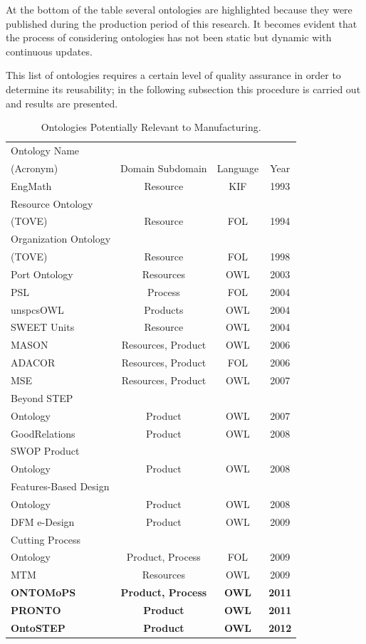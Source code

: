 At the bottom of the table several ontologies are highlighted because they were published during the production period of this research. It becomes evident that the process of considering ontologies has not been static but dynamic with continuous updates. 

This list of ontologies requires a certain level of quality assurance in order to determine its reusability; in the following subsection this procedure is carried out and results are presented.


\begin{table}[tp]%
	
	\caption{Ontologies Potentially Relevant to Manufacturing.}
	\scriptsize
	\label{table4.1}\centering %
	\begin{tabular}{lccc}
		\toprule %
		Ontology Name \\ (Acronym)	& Domain  Subdomain	& Language	& Year \\\toprule
		
		EngMath	& Resource	& KIF	& 1993 \\
		
		Resource Ontology \\ (TOVE)&	Resource &	FOL	& 1994 \\
		Organization Ontology \\ (TOVE)	& Resource&	FOL &	1998 \\
		Port Ontology &	Resources&	OWL&	2003 \\
		PSL&	Process &	FOL&	2004 \\
		unspcsOWL&	Products&	OWL&	2004 \\
		SWEET Units&	Resource&	OWL	&2004 \\
		MASON&	Resources, Product&	OWL	&2006 \\
		ADACOR&	Resources, Product&	FOL	&2006 \\
		MSE	&Resources, Product	&OWL	&2007 \\
		Beyond STEP \\ Ontology &	Product&	OWL	&2007 \\
		GoodRelations &	Product	&OWL&	2008 \\
		SWOP Product  \\ Ontology&	Product&	OWL&	2008 \\
		Features-Based Design \\ Ontology&	Product	&OWL&	2008 \\
		DFM e-Design &	Product	&OWL&	2009 \\
		Cutting Process \\ Ontology&	Product, Process&	FOL &	2009 \\
		MTM	&Resources&	OWL	&2009 \\
		\textbf{ONTOMoPS}&	\textbf{Product, Process}&	\textbf{OWL}&	\textbf{2011} \\
		\textbf{PRONTO}	&\textbf{Product}&	\textbf{OWL}&	\textbf{2011} \\
		\textbf{OntoSTEP}&	\textbf{Product}	&\textbf{OWL}&	\textbf{2012} \\
		
	\end{tabular}
	
\end{table}


